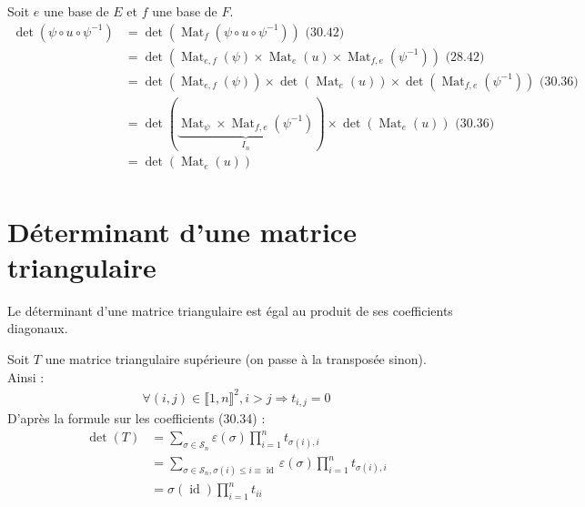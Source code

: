 \documentclass[../main.tex]{subfiles}
\begin{document}
\noindent Soit $e$ une base de $E$ et $f$ une base de $F$. 
\begin{align*}
    \operatorname{det}(\psi\circ u\circ \psi^{-1}) &= \operatorname{det}(\operatorname{Mat}_f(\psi\circ u\circ \psi^{-1})) \text{ (30.42)} \\
    &= \operatorname{det}(\operatorname{Mat}_{e,f}(\psi)\times \operatorname{Mat}_e(u)\times \operatorname{Mat}_{f,e}(\psi^{-1})) \text{ (28.42)} \\
    &= \operatorname{det}(\operatorname{Mat}_{e,f}(\psi)) \times \operatorname{det}(\operatorname{Mat}_e(u)) \times \operatorname{det}(\operatorname{Mat}_{f,e}(\psi^{-1})) \text{ (30.36)} \\
    &= \operatorname{det}(\underbrace{\operatorname{Mat}_{\psi}\times \operatorname{Mat}_{f, e}(\psi^{-1})}_{I_n}) \times \operatorname{det}(\operatorname{Mat}_e(u)) \text{ (30.36)} \\
    &= \operatorname{det}(\operatorname{Mat}_e(u)) \\
\end{align*}

\section{Déterminant d'une matrice triangulaire}
\begin{tcolorbox}[title=Propostion 30.45, title filled=false, colframe=lightblue, colback=lightblue!10!white]
    Le déterminant d'une matrice triangulaire est égal au produit de ses coefficients diagonaux. 
\end{tcolorbox}

\noindent Soit $T$ une matrice triangulaire supérieure (on passe à la transposée sinon). \\
Ainsi : 
\begin{align*}
    \forall (i, j)\in \llbracket 1, n \rrbracket^2, i > j \Rightarrow t_{i, j} = 0
\end{align*}
D'après la formule sur les coefficients (30.34) : 
\begin{align*}
    \operatorname{det}(T) &= \sum_{\sigma\in \mathcal{S}_n} \varepsilon(\sigma) \prod_{i=1}^{n} t_{\sigma(i), i} \\
    &= \sum_{\sigma\in \mathcal{S}_n, \sigma(i) \leq i \equiv \operatorname{id}} \varepsilon(\sigma) \prod_{i=1}^{n} t_{\sigma(i), i} \\
    &= \sigma(\operatorname{id}) \prod_{i=1}^{n} t_{ii} 
\end{align*}
\end{document}

